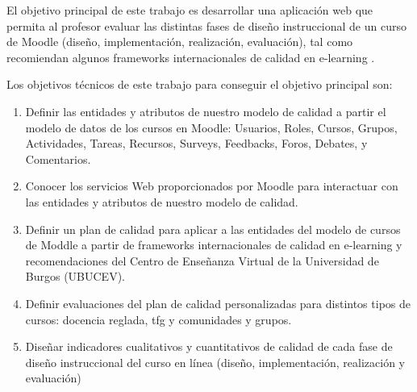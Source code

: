 
El objetivo principal de este trabajo es desarrollar una aplicación web
que permita al profesor evaluar las distintas fases de diseño instruccional de un curso de Moodle (diseño, implementación, realización, evaluación), tal como  recomiendan algunos frameworks internacionales de calidad en e-learning \cite{stracke2018quality}.

Los objetivos técnicos de este trabajo para conseguir el objetivo principal son:
\begin{enumerate}
	\item Definir las entidades y atributos de nuestro modelo de calidad a partir el modelo de datos de los cursos en Moodle: Usuarios, Roles, Cursos, Grupos, Actividades, Tareas, Recursos, Surveys, Feedbacks, Foros, Debates, y Comentarios.
	\item Conocer los servicios Web proporcionados por Moodle para interactuar con las entidades y atributos de nuestro modelo de calidad. 
	\item Definir un plan de calidad para aplicar a las entidades del modelo de cursos de Moddle a partir de frameworks internacionales de calidad en e-learning y recomendaciones del Centro de Enseñanza Virtual de la Universidad de Burgos (UBUCEV). 
	\item Definir evaluaciones del plan de calidad 
	personalizadas para distintos tipos de cursos: docencia reglada, tfg y comunidades y grupos.
	\item Diseñar indicadores cualitativos y cuantitativos de calidad de cada fase de diseño instruccional del curso en línea (diseño, implementación, realización y evaluación) 	
\end{enumerate}
